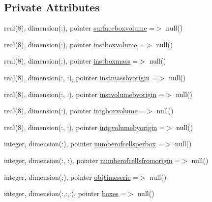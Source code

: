 \subsection*{Private Attributes}
\begin{DoxyCompactItemize}
\item 
real(8), dimension(\+:), pointer \mbox{\hyperlink{structmodulelagrangianglobal_1_1t__monitorization_a321eb068accb5c4898564e6f496eb411}{surfaceboxvolume}} =$>$ null()
\item 
real(8), dimension(\+:), pointer \mbox{\hyperlink{structmodulelagrangianglobal_1_1t__monitorization_a0da699045d74df6b15979cc1a049294f}{instboxvolume}} =$>$ null()
\item 
real(8), dimension(\+:), pointer \mbox{\hyperlink{structmodulelagrangianglobal_1_1t__monitorization_a9fda74b9fa8c59b372e549e082d662f5}{instboxmass}} =$>$ null()
\item 
real(8), dimension(\+:, \+:), pointer \mbox{\hyperlink{structmodulelagrangianglobal_1_1t__monitorization_a47d0fcbd640152fdcb3ecaa16b889134}{instmassbyorigin}} =$>$ null()
\item 
real(8), dimension(\+:, \+:), pointer \mbox{\hyperlink{structmodulelagrangianglobal_1_1t__monitorization_a3348c801dffa6314929157a2e454cf0b}{instvolumebyorigin}} =$>$ null()
\item 
real(8), dimension(\+:), pointer \mbox{\hyperlink{structmodulelagrangianglobal_1_1t__monitorization_a90298f9152ab5be0629718f89aad29c8}{intgboxvolume}} =$>$ null()
\item 
real(8), dimension(\+:, \+:), pointer \mbox{\hyperlink{structmodulelagrangianglobal_1_1t__monitorization_a4bc503b49e32ca6e9448a2488f896aa1}{intgvolumebyorigin}} =$>$ null()
\item 
integer, dimension(\+:), pointer \mbox{\hyperlink{structmodulelagrangianglobal_1_1t__monitorization_a992593c6d80ae807ebc0ae2b92b9ce07}{numberofcellsperbox}} =$>$ null()
\item 
integer, dimension(\+:, \+:), pointer \mbox{\hyperlink{structmodulelagrangianglobal_1_1t__monitorization_a9417c0bcdcb4f3aff3dee92c3e69d488}{numberofcellsfromorigin}} =$>$ null()
\item 
integer, dimension(\+:), pointer \mbox{\hyperlink{structmodulelagrangianglobal_1_1t__monitorization_ac2cc607834dbd8a9ab22f9f86ea10f37}{objtimeserie}} =$>$ null()
\item 
integer, dimension(\+:,\+:,\+:), pointer \mbox{\hyperlink{structmodulelagrangianglobal_1_1t__monitorization_a27717e2512e142a87e81a06212b0b7bd}{boxes}} =$>$ null()

\end{DoxyCompactItemize}
